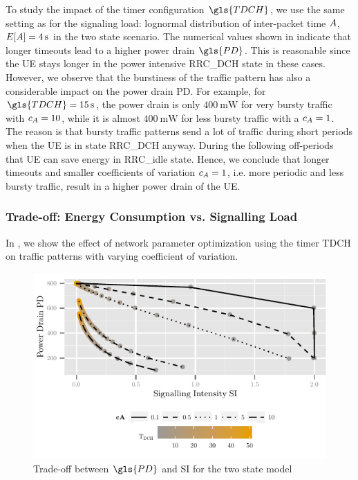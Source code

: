 To study the impact of the timer configuration \(\gls{TDCH}\), we use the same setting as for the signaling load: lognormal distribution of inter-packet time \(A\), \(E[A] = \SI{4}{\second}\) in the two state scenario.
The numerical values shown in  indicate that longer timeouts lead to a higher power drain \(\gls{PD}\).
This is reasonable since the UE stays longer in the power intensive \gls{RRC_DCH} state in these cases.
However, we observe that the burstiness of the traffic pattern has also a considerable impact on the power drain \gls{PD}. 
For example, for \(\gls{TDCH} = \SI{15}{\second}\), the power drain is only \(\SI{400}{\milli\watt}\) for very bursty traffic with \(c_{A} = 10\), while it is almost \(\SI{400}{\milli\watt}\) for less bursty traffic with a \(c_{A} = 1\). 
The reason is that bursty traffic patterns send a lot of traffic during short periods when the UE is in state \gls{RRC_DCH} anyway. During the following off-periods that \gls{UE} can save energy in \gls{RRC_idle} state.
Hence, we conclude that longer timeouts and smaller coefficients of variation \(c_{A} = 1\), i.e. more periodic and less bursty traffic, result in a higher power drain of the \gls{UE}.

\subsubsection*{Trade-off: Energy Consumption vs. Signalling Load}\label{sec:network:performance_model:trade_off}
In , we show the effect of network parameter optimization using the timer \gls{TDCH} on traffic patterns with varying coefficient of variation.

\begin{figure}
	\centering
	\includegraphics{network/performance_model/numerical_examples/figures/2state_pd_vs_si_vs_tdch}
	\caption{Trade-off between \(\gls{PD}\) and \gls{SI} for the two state model}
	\label{fig:network:performance_model:numerical_examples:validations:analytic_vs_simulation:2state_pd_vs_si_vs_tdch}
\end{figure}

